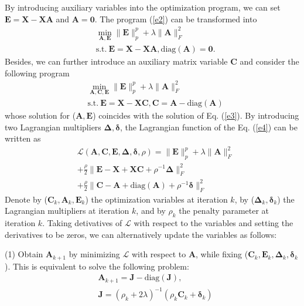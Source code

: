 \documentclass[10pt,twocolumn,letterpaper]{article}
\begin{document}
By introducing auxiliary variables into the optimization program, we can set 
$
\bm{E}
=
\bm{X}
-
\bm{X}\bm{A}
$ 
and 
$
\bm{A}
=
\bm{0}
$.
The program (\ref{e2}) can be transformed into
\begin{equation}
\begin{split}
\label{e3}
&
\min_{\bm{A},\bm{E}}
\|
\bm{E}
\|_{p}^{p}
+
\lambda
\|
\bm{A}
\|_{F}^{2}
\\
& 
\text{s.t.}
\ 
\bm{E}=\bm{X}-\bm{X}\bm{A}
,
\text{diag}(\bm{A})=\bm{0}.
\end{split}
\end{equation}
Besides, we can further introduce an auxiliary matrix variable $\bm{C}$ and consider the following program
\begin{equation}
\begin{split}
\label{e4}
&
\min_{\bm{A},\bm{C},\bm{E}}
\|
\bm{E}
\|_{p}^{p}
+
\lambda
\|
\bm{A}
\|_{F}^{2}
\\
& 
\text{s.t.}
\ 
\bm{E}=\bm{X}-\bm{X}\bm{C}
,
\bm{C}
=
\bm{A}
-
\text{diag}(\bm{A})
\end{split}
\end{equation}
whose solution for ($\bm{A},\bm{E}$) coincides with the solution of Eq. (\ref{e3}). By introducing two Lagrangian multipliers $\bm{\Delta},\bm{\delta}$, the Lagrangian function of the Eq. (\ref{e4}) can be written as
\begin{equation}
\begin{split}
\label{e5}
&
\mathcal{L}
(\bm{A},\bm{C},\bm{E},\bm{\Delta},\bm{\delta},\rho)
=
\|
\bm{E}
\|_{p}^{p}
+
\lambda
\|
\bm{A}
\|_{F}^{2}
\\
&
+
\frac{\rho}{2}
\|
\bm{E}-\bm{X}+\bm{X}\bm{C}+\rho^{-1}\bm{\Delta}
\|_{F}^{2}
\\
&
+
\frac{\rho}{2}
\|
\bm{C}-\bm{A}+\text{diag}(\bm{A})+\rho^{-1}\bm{\delta}
\|_{F}^{2}
\end{split}
\end{equation}
Denote by ($\bm{C}_{k},\bm{A}_{k},\bm{E}_{k}$) the optimization variables at iteration $k$, by ($\bm{\Delta}_{k},\bm{\delta}_{k}$) the Lagrangian multipliers at iteration $k$, and by $\rho_{k}$ the penalty parameter at iteration $k$. Taking detivatives of $\mathcal{L}$ with respect to the variables and setting the derivatives to be zeros, we can alternatively update the variables as follows:

(1) Obtain $\bm{A}_{k+1}$ by minimizing $\mathcal{L}$ with respect to $\bm{A}$, while fixing ($\bm{C}_{k},\bm{E}_{k},\bm{\Delta}_{k},\bm{\delta}_{k}$). This is equivalent to solve the following problem:
\begin{equation}
\begin{split}
\label{e8}
&
\bm{A}_{k+1}
=
\bm{J}-\text{diag}(\bm{J}),
\\
&
\bm{J}
=
(\rho_{k}+2\lambda)^{-1}
(\rho_{k}\bm{C}_{k}+\bm{\delta}_{k})
\end{split}
\end{equation}
\end{document}
